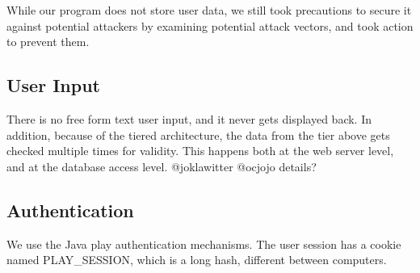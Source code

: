 
While our program does not store user data,
we still took precautions to secure it against potential attackers by examining 
potential attack vectors, and took action to prevent them.

\subsection{User Input}
There is no free form text user input, and it never gets displayed back.
In addition, because of the tiered architecture, the data from the tier above gets checked multiple times for validity.
This happens both at the web server level, and at the database access level.
@joklawitter @ocjojo details?

\subsection{Authentication}
We use the Java play authentication mechanisms.
The user session has a cookie named PLAY\_SESSION, which is a long hash, different between computers.

